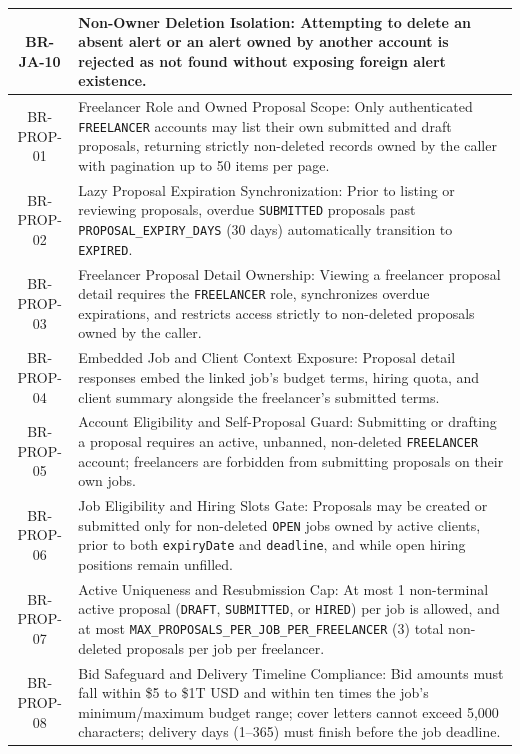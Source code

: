 \begin{longtable}{|c|p{12cm}|}
    BR-JA-10 & Non-Owner Deletion Isolation: Attempting to delete an absent alert or an alert owned by another account is rejected as not found without exposing foreign alert existence. \\ \hline
    BR-PROP-01 & Freelancer Role and Owned Proposal Scope: Only authenticated \texttt{FREELANCER} accounts may list their own submitted and draft proposals, returning strictly non-deleted records owned by the caller with pagination up to 50 items per page. \\ \hline
    BR-PROP-02 & Lazy Proposal Expiration Synchronization: Prior to listing or reviewing proposals, overdue \texttt{SUBMITTED} proposals past \texttt{PROPOSAL\_EXPIRY\_DAYS} (30 days) automatically transition to \texttt{EXPIRED}. \\ \hline
    BR-PROP-03 & Freelancer Proposal Detail Ownership: Viewing a freelancer proposal detail requires the \texttt{FREELANCER} role, synchronizes overdue expirations, and restricts access strictly to non-deleted proposals owned by the caller. \\ \hline
    BR-PROP-04 & Embedded Job and Client Context Exposure: Proposal detail responses embed the linked job's budget terms, hiring quota, and client summary alongside the freelancer's submitted terms. \\ \hline
    BR-PROP-05 & Account Eligibility and Self-Proposal Guard: Submitting or drafting a proposal requires an active, unbanned, non-deleted \texttt{FREELANCER} account; freelancers are forbidden from submitting proposals on their own jobs. \\ \hline
    BR-PROP-06 & Job Eligibility and Hiring Slots Gate: Proposals may be created or submitted only for non-deleted \texttt{OPEN} jobs owned by active clients, prior to both \texttt{expiryDate} and \texttt{deadline}, and while open hiring positions remain unfilled. \\ \hline
    BR-PROP-07 & Active Uniqueness and Resubmission Cap: At most 1 non-terminal active proposal (\texttt{DRAFT}, \texttt{SUBMITTED}, or \texttt{HIRED}) per job is allowed, and at most \texttt{MAX\_PROPOSALS\_PER\_JOB\_PER\_FREELANCER} (3) total non-deleted proposals per job per freelancer. \\ \hline
    BR-PROP-08 & Bid Safeguard and Delivery Timeline Compliance: Bid amounts must fall within \$5 to \$1T USD and within ten times the job's minimum/maximum budget range; cover letters cannot exceed 5,000 characters; delivery days (1--365) must finish before the job deadline. \\ \hline

\end{longtable}
